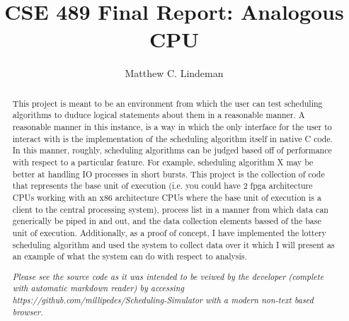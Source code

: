 \documentclass[acmsmall]{acmart}
\begin{document}
\title{CSE 489 Final Report: Analogous CPU}

\author{Matthew C. Lindeman}

\renewcommand{\shortauthors}{Matthew C. Lindeman}

\begin{abstract}
  This project is meant to be an environment from which the user can test
  scheduling algorithms to duduce logical statements about them in a reasonable
  manner. A reasonable manner in this instance, is a way in which the only
  interface for the user to interact with is the implementation of the
  scheduling algorithm itself in native C code. In this manner, roughly, scheduling algorithms
  can be judged based off of performance with respect to a particular feature.
  For example, scheduling algorithm X may be better at handling IO processes in
  short bursts. This project is the collection of code that represents the base
  unit of execution (i.e. you could have 2 fpga architecture CPUs working with
  an x86 architecture CPUs where the base unit of execution is a client to the
  central processing system), process list in a manner from which data can
  generically be piped in and out, and the data collection elements bassed of
  the base unit of execution. Additionally, as a proof of concept, I have
  implemented the lottery scheduling algorithm and used the system to collect
  data over it which I will present as an example of what the system can do with
  respect to analysis.
  \par
  {\it Please see the source code as it was intended to be veiwed by the developer
  (complete with automatic markdown reader) by accessing
  https://github.com/millipedes/Scheduling-Simulator with a modern non-text
  based browser.}
\end{abstract}
\end{document}
